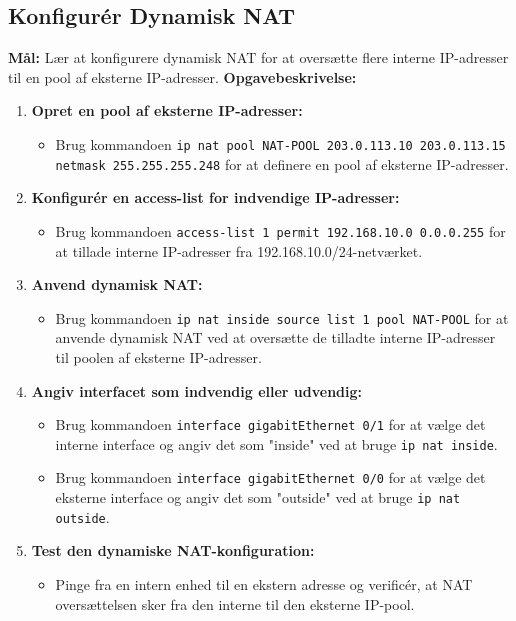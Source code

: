\subsection{Konfigurér Dynamisk NAT}
\textbf{Mål:} Lær at konfigurere dynamisk NAT for at oversætte flere interne IP-adresser til en pool af eksterne IP-adresser.
\newline\newline\noindent
\textbf{Opgavebeskrivelse:}
\begin{enumerate}
	\item \textbf{Opret en pool af eksterne IP-adresser:}
	\begin{itemize}
		\item Brug kommandoen \texttt{ip nat pool NAT-POOL 203.0.113.10 203.0.113.15 netmask 255.255.255.248} for at definere en pool af eksterne IP-adresser.
	\end{itemize}
	\item \textbf{Konfigurér en access-list for indvendige IP-adresser:}
	\begin{itemize}
		\item Brug kommandoen \texttt{access-list 1 permit 192.168.10.0 0.0.0.255} for at tillade interne IP-adresser fra 192.168.10.0/24-netværket.
	\end{itemize}
	\item \textbf{Anvend dynamisk NAT:}
	\begin{itemize}
		\item Brug kommandoen \texttt{ip nat inside source list 1 pool NAT-POOL} for at anvende dynamisk NAT ved at oversætte de tilladte interne IP-adresser til poolen af eksterne IP-adresser.
	\end{itemize}
	\item \textbf{Angiv interfacet som indvendig eller udvendig:}
	\begin{itemize}
		\item Brug kommandoen \texttt{interface gigabitEthernet 0/1} for at vælge det interne interface og angiv det som "inside" ved at bruge \texttt{ip nat inside}.
		\item Brug kommandoen \texttt{interface gigabitEthernet 0/0} for at vælge det eksterne interface og angiv det som "outside" ved at bruge \texttt{ip nat outside}.
	\end{itemize}
	\item \textbf{Test den dynamiske NAT-konfiguration:}
	\begin{itemize}
		\item Pinge fra en intern enhed til en ekstern adresse og verificér, at NAT oversættelsen sker fra den interne til den eksterne IP-pool.
	\end{itemize}
\end{enumerate}


